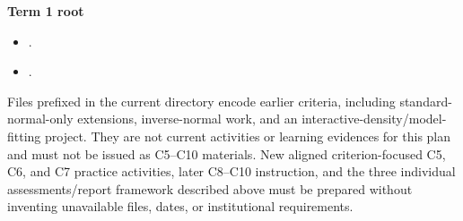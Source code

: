 \documentclass[10pt,letterpaper]{article}
\newcommand{\plansubsection}[1]{\Needspace{7\baselineskip}\par\vspace{5pt}{\normalsize\bfseries #1\par}\vspace{1pt}}
\begin{document}
	\textbf{Term 1 root}
	\begin{itemize}
		\item \href{https://nolopez338.github.io/global_economics/book2026-2027/grade11/term_1/PGF-02-R39_G11_Global_T1_2026-2027-plain.pdf}{\texttt{}}.
		\item \href{https://nolopez338.github.io/global_economics/book2026-2027/grade11/term_1/PGF-02-R39_G11_Global_T1_2026-2027.pdf}{\texttt{}}.
	\end{itemize}
	\plansubsection{Legacy-material boundary}
	Files prefixed \textnormal{} in the current directory encode earlier criteria, including standard-normal-only extensions, inverse-normal work, and an interactive-density/model-fitting project. They are not current activities or learning evidences for this plan and must not be issued as C5--C10 materials. New aligned criterion-focused C5, C6, and C7 practice activities, later C8--C10 instruction, and the three individual assessments/report framework described above must be prepared without inventing unavailable files, dates, or institutional requirements.
	
\end{document}
